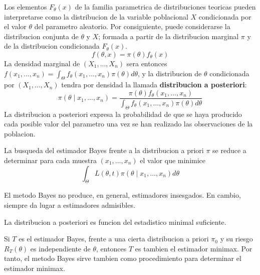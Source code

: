 \documentclass[10pt]{extarticle}
\newcommand{\<}{\langle}
\renewcommand{\>}{\rangle}
\theoremstyle{definition}
\begin{document}
\begin{itemize}
        Los elementos $F_\theta(x)$ de la familia parametrica de distribuciones teoricas pueden interpretarse como la distribucion de la variable poblacional $X$ condicionada por el valor $\theta$ del parametro aleatorio. Por consiguiente, puede considerarse la distribucion conjunta de $\theta$ y $X$; formada a partir de la distribucion marginal $\pi$ y de la distribucion condicionada $F_\theta(x)$.
        \begin{equation*}
          f(\theta, x) = \pi(\theta)f_\theta(x)
        \end{equation*}
        La densidad marginal de $(X_1, ..., X_n)$ sera entonces $f(x_1,...,x_n)=\int_\Theta f_\theta(x_1,...,x_n)\pi(\theta)d\theta$, y la distribucion de $\theta$ condicionada por $(X_1,...,X_n)$ tendra por densidad la llamada \textbf{distribucion a posteriori}:
        \begin{equation*}
          \pi(\theta \mid x_1,...,x_n) = \dfrac{\pi(\theta)f_\theta(x_1,...,x_n)}{\int_\Theta f_\theta(x_1,...,x_n) \pi(\theta) d\theta}
        \end{equation*}
        La distribucion a posteriori expresa la probabilidad de que se haya producido cada posible valor del parametro una vez se han realizado las observaciones de la poblacion.

        La busqueda del estimador Bayes frente a la distribucion a priori $\pi$ se reduce a determinar para cada muestra $(x_1, ..., x_n)$ el valor que minimice
        \begin{equation*}
          \int_\Theta L(\theta, t) \pi(\theta \mid x_1,..., x_n) d\theta
        \end{equation*}

        El metodo Bayes no produce, en general, estimadores insesgados. En cambio, siempre da lugar a estimadores admisibles.

        La distribucion a posteriori es funcion del estadistico minimal suficiente.

        Si $T$ es el estimador Bayes, frente a una cierta distribucion a priori $\pi_0$ y su riesgo $R_T(\theta)$ es independiente de $\theta$, entonces $T$ es tambien el estimador minimax. Por tanto, el metodo Bayes sirve tambien como procedimiento para determinar el estimador minimax.
\end{itemize}
\end{document}
